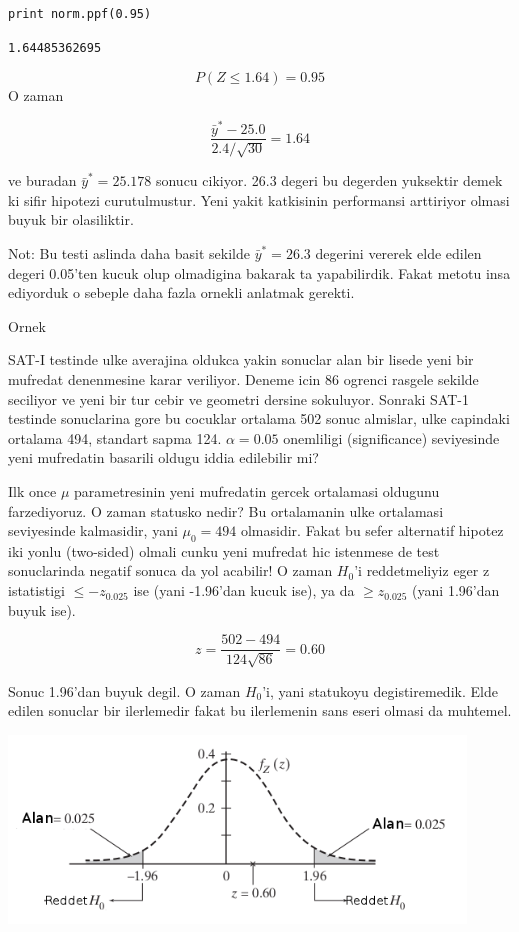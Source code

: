 \documentclass[12pt,fleqn]{article}\usepackage{../common}
\begin{document}
\begin{verbatim}
print norm.ppf(0.95)
\end{verbatim}

\begin{verbatim}
1.64485362695
\end{verbatim}


$$ P(Z \le 1.64)  = 0.95 $$
O zaman 

$$ \frac{\bar{y}^* - 25.0}{2.4 / \sqrt{30}} = 1.64 $$

ve buradan $\bar{y}^* = 25.178$ sonucu cikiyor. 26.3 degeri bu degerden
yuksektir demek ki sifir hipotezi curutulmustur. Yeni yakit katkisinin
performansi arttiriyor olmasi buyuk bir olasiliktir. 

Not: Bu testi aslinda daha basit sekilde $\bar{y}^* = 26.3$ degerini
vererek elde edilen degeri 0.05'ten kucuk olup olmadigina bakarak ta
yapabilirdik. Fakat metotu insa ediyorduk o sebeple daha fazla ornekli
anlatmak gerekti. 

Ornek

SAT-I testinde ulke averajina oldukca yakin sonuclar alan bir lisede yeni
bir mufredat denenmesine karar veriliyor. Deneme icin 86 ogrenci rasgele
sekilde seciliyor ve yeni bir tur cebir ve geometri dersine
sokuluyor. Sonraki SAT-1 testinde sonuclarina gore bu cocuklar ortalama 502
sonuc almislar, ulke capindaki ortalama 494, standart sapma
124. $\alpha=0.05$ onemliligi (significance) seviyesinde yeni mufredatin
basarili oldugu iddia edilebilir mi? 

Ilk once $\mu$ parametresinin yeni mufredatin gercek ortalamasi oldugunu
farzediyoruz. O zaman statusko nedir? Bu ortalamanin ulke ortalamasi
seviyesinde kalmasidir, yani $\mu_0 = 494$ olmasidir. Fakat bu sefer
alternatif hipotez iki yonlu (two-sided) olmali cunku yeni mufredat hic
istenmese de test sonuclarinda negatif sonuca da yol acabilir! O zaman
$H_0$'i reddetmeliyiz eger z istatistigi $\le -z_{0.025}$ ise (yani
-1.96'dan kucuk ise), ya da $\ge z_{0.025}$ (yani 1.96'dan buyuk ise). 

$$ z = \frac{502-494}{124\sqrt{86}} = 0.60$$

Sonuc 1.96'dan buyuk degil. O zaman $H_0$'i, yani statukoyu
degistiremedik. Elde edilen sonuclar bir ilerlemedir fakat bu ilerlemenin sans
eseri olmasi da muhtemel.

\includegraphics[height=5cm]{sat1.png}
\end{document}
